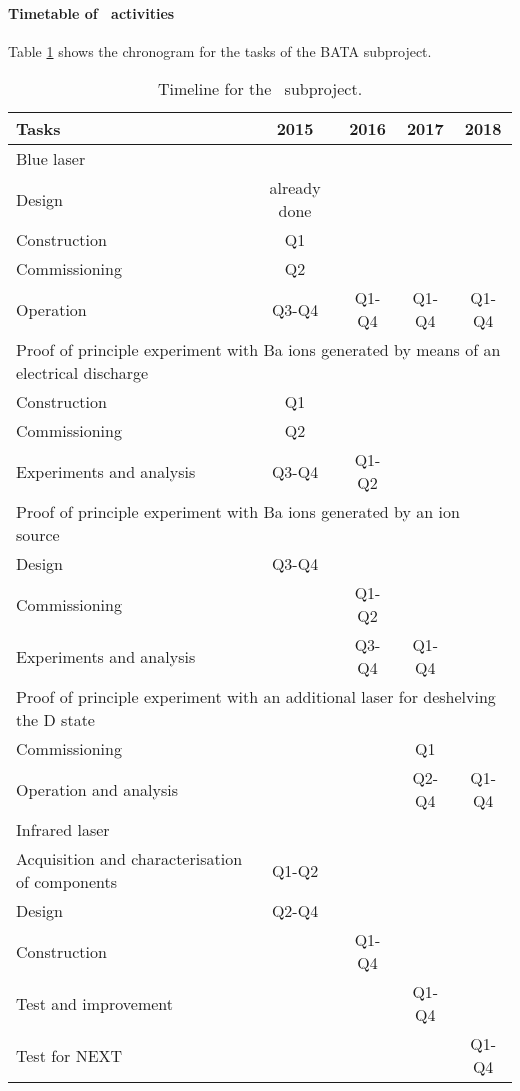\paragraph{Timetable of \BATA\ activities}
Table \ref{tab:schedule_bata} shows the chronogram for the tasks of the BATA subproject. 

\begin{table}
\begin{center}
\begin{tabular}{| l | c | c | c | c |}
\hline
Tasks & 2015 & 2016 & 2017 & 2018 \\
\hline
\multicolumn{5}{|l|}{Blue laser}  \\
Design & already done & & &  \\
Construction & Q1 & & & \\
Commissioning & Q2& & & \\
Operation &  Q3-Q4 & Q1-Q4 &  Q1-Q4&  Q1-Q4\\
\hline
\multicolumn{5}{|l|}{Proof of principle experiment with Ba ions generated by means of an electrical discharge}  \\
Construction  &  Q1 & & & \\
Commissioning &  Q2 & & & \\
Experiments and analysis &  Q3-Q4 & Q1-Q2& & \\
\hline
\multicolumn{5}{|l|}{Proof of principle experiment with Ba ions generated by an ion source}  \\
Design & Q3-Q4 & & &  \\
Commissioning  &  & Q1-Q2& & \\
Experiments and analysis &  & Q3-Q4 & Q1-Q4 & \\
\hline
\multicolumn{5}{|l|}{Proof of principle experiment with an additional laser for deshelving the D state}  \\
Commissioning  &  &  & Q1 & \\
Operation and analysis &  &  & Q2-Q4 & Q1-Q4 \\
\hline
\multicolumn{5}{|l|}{Infrared laser}  \\
Acquisition and characterisation of components  & Q1-Q2 & & &  \\
Design  & Q2-Q4  & & & \\
Construction &  & Q1-Q4 & & \\
Test and improvement &  & & Q1-Q4 & \\
Test for NEXT & & &  & Q1-Q4\\
\hline
\end{tabular}
\caption{Timeline for the \BATA\ subproject.}
\label{tab:schedule_bata}
\end{center}
\end{table}
